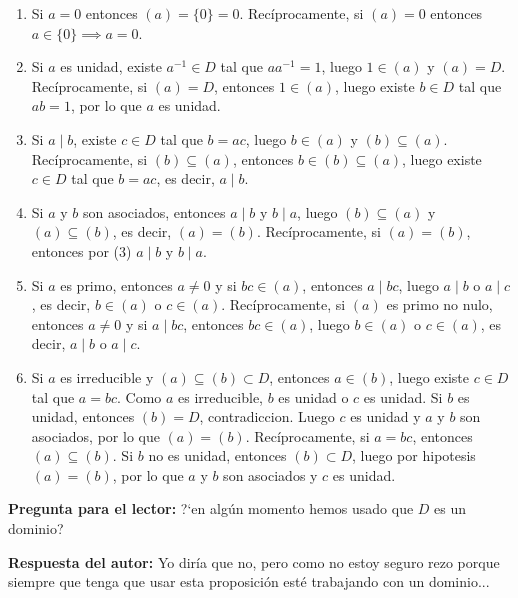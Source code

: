 \begin{proofbox}

\begin{enumerate}
    \item Si \(a = 0\) entonces \((a) = \{0\} = 0\). Recíprocamente, si \((a) = 0\) entonces \(a \in \{0\} \implies a = 0\).

    \item Si \(a\) es unidad, existe \(a^{-1} \in D\) tal que \(aa^{-1} = 1\), luego \(1 \in (a)\) y \((a) = D\). Recíprocamente, si \((a) = D\), entonces \(1 \in (a)\), luego existe \(b \in D\) tal que \(ab = 1\), por lo que \(a\) es unidad.

    \item Si \(a \mid b\), existe \(c \in D\) tal que \(b = ac\), luego \(b \in (a)\) y \((b) \subseteq (a)\). Recíprocamente, si \((b) \subseteq (a)\), entonces \(b \in (b) \subseteq (a)\), luego existe \(c \in D\) tal que \(b = ac\), es decir, \(a \mid b\).

    \item Si \(a\) y \(b\) son asociados, entonces \(a \mid b\) y \(b \mid a\), luego \((b) \subseteq (a)\) y \((a) \subseteq (b)\), es decir, \((a) = (b)\). Recíprocamente, si \((a) = (b)\), entonces por (3) \(a \mid b\) y \(b \mid a\).

    \item Si \(a\) es primo, entonces \(a \neq 0\) y si \(bc \in (a)\), entonces \(a \mid bc\), luego \(a \mid b\) o \(a \mid c\), es decir, \(b \in (a)\) o \(c \in (a)\). Recíprocamente, si \((a)\) es primo no nulo, entonces \(a \neq 0\) y si \(a \mid bc\), entonces \(bc \in (a)\), luego \(b \in (a)\) o \(c \in (a)\), es decir, \(a \mid b\) o \(a \mid c\).

    \item Si \(a\) es irreducible y \((a) \subseteq (b) \subset D\), entonces \(a \in (b)\), luego existe \(c \in D\) tal que \(a = bc\). Como \(a\) es irreducible, \(b\) es unidad o \(c\) es unidad. Si \(b\) es unidad, entonces \((b) = D\), contradiccion. Luego \(c\) es unidad y \(a\) y \(b\) son asociados, por lo que \((a) = (b)\). Recíprocamente, si \(a = bc\), entonces \((a) \subseteq (b)\). Si \(b\) no es unidad, entonces \((b) \subset D\), luego por hipotesis \((a) = (b)\), por lo que \(a\) y \(b\) son asociados y \(c\) es unidad.
\end{enumerate}

\end{proofbox}

\begin{remark}
    \textbf{Pregunta para el lector:} ?`en algún momento hemos usado que $D$ es un dominio?
    
    \noindent\textbf{Respuesta del autor:} Yo diría que no, pero como no estoy seguro rezo porque siempre que tenga que usar esta proposición esté trabajando con un dominio...
\end{remark}

